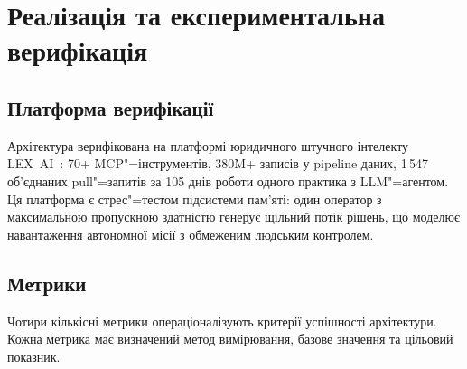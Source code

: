 
\section{Реалізація та експериментальна верифікація}
\label{sec:evaluation}

\subsection{Платформа верифікації}
\label{sec:platform}

Архітектура верифікована на платформі юридичного штучного інтелекту LEX~AI~\citep{ovcharov2026edittrace}: 70+ MCP"=інструментів, 380M+ записів у pipeline даних, 1\,547 об'єднаних pull"=запитів за 105 днів роботи одного практика з LLM"=агентом.
Ця платформа є стрес"=тестом підсистеми пам'яті: один оператор з максимальною пропускною здатністю генерує щільний потік рішень, що моделює навантаження автономної місії з обмеженим людським контролем.


\subsection{Метрики}
\label{sec:metrics}

Чотири кількісні метрики операціоналізують критерії успішності архітектури.
Кожна метрика має визначений метод вимірювання, базове значення та цільовий показник.

